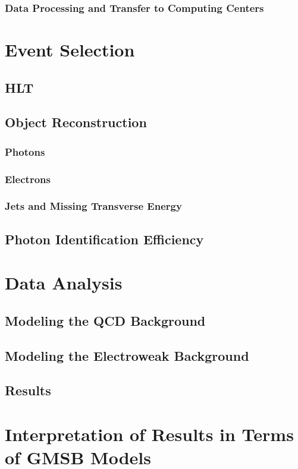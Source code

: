 \documentclass[12pt, letterpaper]{report}
\begin{document}
\subsection{Data Processing and Transfer to Computing Centers}

\chapter{Event Selection}
\section{HLT}
\section{Object Reconstruction}
\subsection{Photons}
\subsection{Electrons}
\subsection{Jets and Missing Transverse Energy}
\section{Photon Identification Efficiency}

\chapter{Data Analysis}
\section{Modeling the QCD Background}
\section{Modeling the Electroweak Background}
\section{Results}

\chapter{Interpretation of Results in Terms of GMSB Models}
\end{document}

